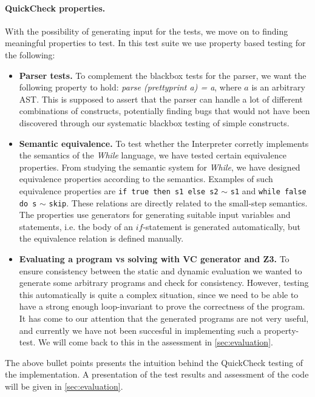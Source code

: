 \paragraph{QuickCheck properties.}
With the possibility of generating input for the tests, we move on to finding meaningful properties to test. In this test suite we use property based testing for the following:
\begin{itemize}
  \item \textbf{Parser tests.}
  To complement the blackbox tests for the parser, we want the following property to hold: \textit{parse (prettyprint a) = a}, where $a$ is an arbitrary AST. This is supposed to assert that the parser can handle a lot of different combinations of constructs, potentially finding bugs that would not have been discovered through our systematic blackbox testing of simple constructs.
	\item \textbf{Semantic equivalence.}
  To test whether the Interpreter corretly implements the semantics of the \textit{While} language, we have tested certain equivalence properties. From studying the semantic system for \textit{While}, we have designed equivalence properties according to the semantics.
	Examples of such equivalence properties are \texttt{if true then s1 else s2} $\sim$ \texttt{s1} and \texttt{while false do s} $\sim$ \texttt{skip}.
  These relations are directly related to the small-step semantics. 
  The properties use generators for generating suitable input variables and statements, i.e. the body of an $if$-statement is generated automatically, but the equivalence relation is defined manually.
	\item \textbf{Evaluating a program vs solving with VC generator and Z3.}
    To ensure consistency between the static and dynamic evaluation we wanted to generate some arbitrary programs and check for consistency.
	However, testing this automatically is quite a complex situation, since we need to be able to have a strong enough loop-invariant to prove the correctness of the program.
	It has come to our attention that the generated programs are not very useful, and currently we have not been succesful in implementing such a property-test. We will come back to this in the assessment in \cref{sec:evaluation}.
\end{itemize}

The above bullet points presents the intuition behind the QuickCheck testing of the implementation. A presentation of the test results and assessment of the code will be given in \cref{sec:evaluation}.






















